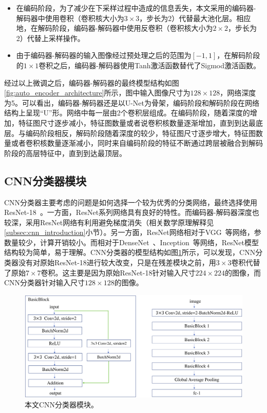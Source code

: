 \begin{itemize}
	\item 在编码阶段，为了减少在下采样过程中造成的信息丢失，本文采用的编码器-解码器中使用卷积（卷积核大小为$3\times 3$，步长为2）代替最大池化层。相应地，在解码阶段，编码器-解码器中使用反卷积（卷积核大小为$2\times 2$，步长为2）代替上采样操作。
	\item 由于编码器-解码器的输入图像经过预处理之后的范围为$[-1,1]$，在解码阶段的$1\times 1$卷积之后，编码器-解码器使用Tanh激活函数替代了Sigmod激活函数。
\end{itemize}
经过以上微调之后，编码器-解码器的最终模型结构如图\ref{fig:auto_encoder_architecture}所示，图中输入图像尺寸为$128\times 128$，网络深度为5。可以看出，编码器-解码器还是以U-Net为骨架，编码阶段和解码阶段在网络结构上呈现“U”形。网络中每一层由2个卷积层组成。在编码阶段，随着深度的增加，特征图尺寸逐步减小，特征图数量或者说卷积核数量逐渐增加，直到到达最底层。与编码阶段相反，解码阶段随着深度的较少，特征图尺寸逐步增大，特征图数量或者卷积核数量逐渐减小，同时来自编码阶段的特征不断通过跨层被融合到解码阶段的高层特征中，直到到达最顶层。
\subsection{CNN分类器模块}\label{subsec:cnn_classifier_model}
CNN分类器主要考虑的问题是如何选择一个较为优秀的分类网络，最终选择使用ResNet-18~\cite{he2016deep}。一方面，ResNet系列网络具有良好的特性。而编码器-解码器深度也较深，采用ResNet网络有利用避免梯度消失（相关数学原理解释见\ref{subsec:cnn_introduction}小节）。另一方面，ResNet网络相对于VGG~\cite{simonyan2014very}等网络，参数量较少，计算开销较小。而相对于DenseNet~\cite{huang2017densely}、Inception~\cite{Szegedy2015RethinkingTI}等网络，ResNet模型结构较为简单，易于理解。CNN分类器的模型结构如图\ref{fig:classifier_architecture}所示，可以发现，CNN分类器没有对原始ResNet-18进行较大改变，只是在残差模块之前，用$3\times 3$卷积代替了原始$7\times 7$卷积。这主要是因为原始ResNet-18针对输入尺寸$224\times 224$的图像，而CNN分类器针对输入尺寸$128\times 128$的图像。
\begin{figure}[h]
	\centering
	\includegraphics[width=1.0\textwidth]{figure/classifier_architecture.png}
	\caption[本文CNN分类器模块]{本文CNN分类器模块。}
	\label{fig:classifier_architecture}
\end{figure}
